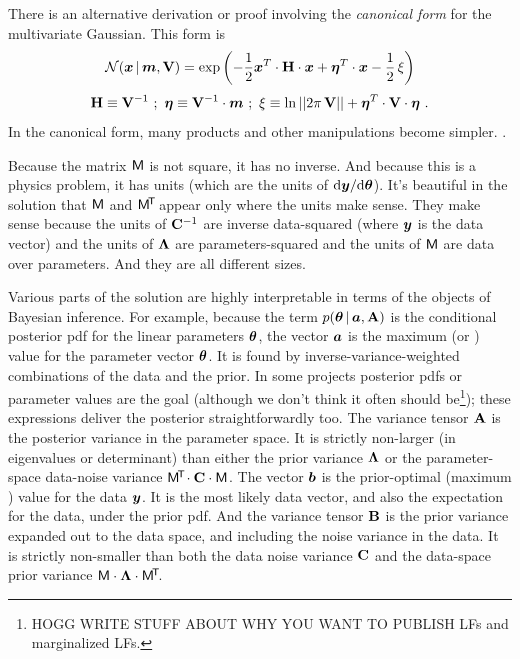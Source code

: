 There is an alternative derivation or proof involving the
\textsl{canonical form} for the multivariate Gaussian. This form is
\begin{equation}
\mathcal{N}\!\,(\boldsymbol{x}\,|\,\boldsymbol{m},\mathbf{V}) = \exp\left(-\frac{1}{2}\boldsymbol{x}^T \cdot\mathbf{H} \cdot \boldsymbol{x} + \boldsymbol{\eta}^T \cdot \boldsymbol{x} - \frac{1}{2}\,\xi\right)
\end{equation}
\begin{equation}
\mathbf{H}\equiv\mathbf{V}^{-1} ~;~
\boldsymbol{\eta}\equiv\mathbf{V}^{-1}\cdot\boldsymbol{m} ~;~
\xi\equiv\ln||2\pi\,\mathbf{V}||+\boldsymbol{\eta}^T\cdot\mathbf{V}\cdot\boldsymbol{\eta} ~.
\end{equation}
In the canonical form, many products and other manipulations become
simpler. .

Because the matrix $\mathsf{M}$ is not square, it has no inverse. And because this
is a physics problem, it has units (which are the units of $\mathrm{d}\boldsymbol{y}/\mathrm{d}\boldsymbol{\theta}$).
It's beautiful in the solution that $\mathsf{M}$ and $\mathsf{M}^{\!\mathsf{T}\!}$ appear only where the
units make sense.
They make sense because the units of $\mathbf{C}^{-1}$ are inverse data-squared (where $\boldsymbol{y}$
is the data vector) and the units of $\mathbf{\Lambda}$ are parameters-squared and the units
of $\mathsf{M}$ are data over parameters.
And they are all different sizes.

Various parts of the solution are highly interpretable in terms of the
objects of Bayesian inference. For example, because the term $p(\boldsymbol{\theta}\,|\, \boldsymbol{a},\mathbf{A})$
is the conditional
posterior pdf for the linear parameters $\boldsymbol{\theta}$, the vector $\boldsymbol{a}$ is the
maximum  (or ) value for the parameter vector
$\boldsymbol{\theta}$.
It is found by inverse-variance-weighted combinations of the data and the prior.
In some projects posterior pdfs or  parameter values are the goal
(although we don't think it often should be\footnote{HOGG WRITE STUFF ABOUT WHY YOU WANT TO PUBLISH LFs and marginalized LFs.}); these expressions deliver the posterior
straightforwardly too.
The variance tensor $\mathbf{A}$ is the posterior variance in the parameter space.
It is strictly non-larger (in eigenvalues or determinant) than either
the prior variance $\mathbf{\Lambda}$ or the parameter-space data-noise
variance $\mathsf{M}^{\!\mathsf{T}\!}\cdot\mathbf{C}\cdot\mathsf{M}$.
The vector $\boldsymbol{b}$ is the prior-optimal (maximum )
value for the data $\boldsymbol{y}$.
It is the most likely data vector, and also the expectation for the data,
under the prior pdf.
And the variance tensor $\mathbf{B}$ is the prior variance expanded out to the
data space, and including the noise variance in the data.
It is strictly non-smaller than both the data noise variance $\mathbf{C}$ and the
data-space prior variance $\mathsf{M}\cdot\mathbf{\Lambda}\cdot\mathsf{M}^{\!\mathsf{T}\!}$.


